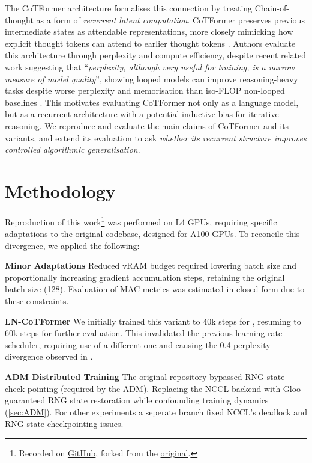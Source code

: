 \documentclass[10pt, letterpaper]{article} %
\begin{document}
The CoTFormer architecture formalises this connection by treating Chain-of-thought as a form of \emph{recurrent latent computation}. CoTFormer preserves previous intermediate states as attendable representations, more closely mimicking how explicit thought tokens can attend to earlier thought tokens \cite{cotformer}. Authors evaluate this architecture through perplexity and compute efficiency, despite recent related work suggesting that ``\emph{perplexity, although very useful for training, is a narrow measure of model quality}'', showing looped models can improve reasoning-heavy tasks despite worse perplexity and memorisation than iso-FLOP non-looped baselines \cite{saunshi2025reasoning}. This motivates evaluating CoTFormer not only as a language model, but as a recurrent architecture with a potential inductive bias for iterative reasoning. We reproduce and evaluate the main claims of CoTFormer and its variants, and extend its evaluation to ask \emph{whether its recurrent structure improves controlled algorithmic generalisation}.
\section{Methodology}\label{sec:methodology}

Reproduction of this work\footnote{Recorded on \href{https://github.com/COMP6258-Reproducibility-Challenge/CoTFormer}{GitHub}, forked from the \href{https://github.com/epfml/CoTFormer}{original}.} was performed on L4 GPUs, requiring specific adaptations to the original codebase, designed for A100 GPUs. To reconcile this divergence, we applied the following:

\textbf{Minor Adaptations} Reduced vRAM budget required lowering batch size and proportionally increasing gradient accumulation steps, retaining the original batch size (128). Evaluation of MAC metrics was estimated in closed-form due to these constraints. 

\textbf{LN-CoTFormer} We initially trained this variant to 40k steps for , resuming to 60k steps for further evaluation. This invalidated the previous learning-rate scheduler, requiring use of a different one and causing the 0.4 perplexity divergence observed in .

\textbf{ADM Distributed Training} The original repository bypassed RNG state check-pointing (required by the ADM). 
Replacing the NCCL backend with Gloo guaranteed RNG state restoration while confounding training dynamics (\cref{sec:ADM}). For other experiments a seperate branch fixed NCCL's deadlock and RNG state checkpointing issues.
\end{document}

